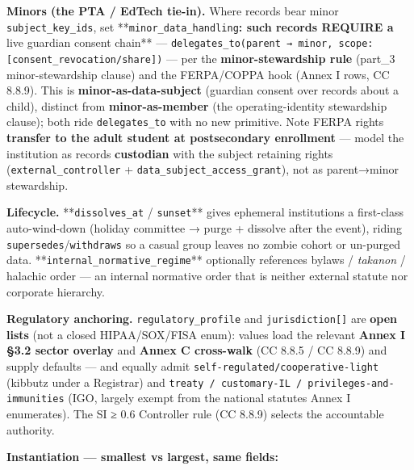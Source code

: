 \documentclass[11pt]{article}
\begin{document}
\textbf{Minors (the PTA / EdTech tie-in).} Where records bear minor \texttt{subject\_key\_ids}, set **\texttt{minor\_data\_handling}\textbf{: such records REQUIRE a }live guardian consent chain** — \texttt{delegates\_to(parent → minor, scope: [consent\_revocation/share])} — per the \textbf{minor-stewardship rule} (part\_3 minor-stewardship clause) and the FERPA/COPPA hook (Annex I rows, CC 8.8.9). This is \textbf{minor-as-data-subject} (guardian consent over records about a child), distinct from \textbf{minor-as-member} (the operating-identity stewardship clause); both ride \texttt{delegates\_to} with no new primitive. Note FERPA rights \textbf{transfer to the adult student at postsecondary enrollment} — model the institution as records \textbf{custodian} with the subject retaining rights (\texttt{external\_controller} + \texttt{data\_subject\_access\_grant}), not as parent→minor stewardship.


\textbf{Lifecycle.} **\texttt{dissolves\_at} / \texttt{sunset}** gives ephemeral institutions a first-class auto-wind-down (holiday committee → purge + dissolve after the event), riding \texttt{supersedes}/\texttt{withdraws} so a casual group leaves no zombie cohort or un-purged data. **\texttt{internal\_normative\_regime}** optionally references bylaws / \textit{takanon} / halachic order — an internal normative order that is neither external statute nor corporate hierarchy.


\textbf{Regulatory anchoring.} \texttt{regulatory\_profile} and \texttt{jurisdiction[]} are \textbf{open lists} (not a closed HIPAA/SOX/FISA enum): values load the relevant \textbf{Annex I §3.2 sector overlay} and \textbf{Annex C cross-walk} (CC 8.8.5 / CC 8.8.9) and supply defaults — and equally admit \texttt{self-regulated/cooperative-light} (kibbutz under a Registrar) and \texttt{treaty / customary-IL / privileges-and-immunities} (IGO, largely exempt from the national statutes Annex I enumerates). The SI ≥ 0.6 Controller rule (CC 8.8.9) selects the accountable authority.


\textbf{Instantiation — smallest vs largest, same fields:}
\end{document}

